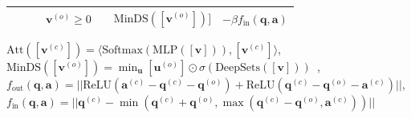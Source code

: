 \begin{table}[H]
\begin{adjustbox}{width=\textwidth}
\begin{tabular}{lcccccc}
  &  &  & $\mathbf{v}^{(o)} \geq 0$ & & $\text{MinDS}([\mathbf{v}^{(o)}])]$  & $-\beta f_{\text{in}}(\mathbf{q},\mathbf{a})$  \\
\bottomrule
\end{tabular}
\end{adjustbox}
$\text{Att}([\mathbf{v}^{(c)}])=\langle \text{Softmax}(\text{MLP}([\mathbf{v}])), [\mathbf{v}^{(c)}] \rangle$, \\$\text{MinDS}([\mathbf{v}^{(o)}]) = \min_{\mathbf{u}}{[\mathbf{u}^{(o)}]} \odot \sigma(\text{DeepSets}([\mathbf{v}]))$~\cite{zaheer_deep_2017,hamilton_embedding_2018}, \\
$f_{\text{out}}(\mathbf{q},\mathbf{a}) = ||\text{ReLU}(\mathbf{a}^{(c)} - \mathbf{q}^{(c)} - \mathbf{q}^{(o)}) + \text{ReLU}(\mathbf{q}^{(c)} - \mathbf{q}^{(o)} - \mathbf{a}^{(c)})||$,\\
$f_{\text{in}}(\mathbf{q},\mathbf{a}) = ||\mathbf{q}^{(c)} - \min(\mathbf{q}^{(c)} + \mathbf{q}^{(o)}, \max(\mathbf{q}^{(c)} - \mathbf{q}^{(o)},\mathbf{a}^{(c)}))||$
\end{table}
